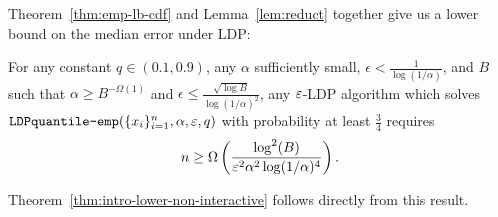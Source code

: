 Theorem~\ref{thm:emp-lb-cdf} and Lemma~\ref{lem:reduct} together give us a lower bound on the median error under LDP:

\begin{theorem}\label{thm:lb-non-adapt}
    For any constant $q \in (0.1, 0.9)$, any $\alpha$ sufficiently small, $\epsilon < \frac{1}{\log(1/\alpha)}$, and $B$ such that $\alpha \geq B^{-\Omega(1)}$ and $\epsilon \leq \frac{\sqrt{\log B}}{\log(1/\alpha)^2}$, any $\varepsilon$-LDP algorithm which solves $\texttt{LDPquantile-emp}(\{x_i\}_{i=1}^n, \alpha, \varepsilon, q)$ with probability at least $\frac{3}{4}$ requires 
    \[
        n \geq \Omega\left(\frac{\log^2(B)}{\varepsilon^2 \alpha^2 \log(1/\alpha)^4}\right).
    \]
\end{theorem}
Theorem~\ref{thm:intro-lower-non-interactive} follows directly from this result.